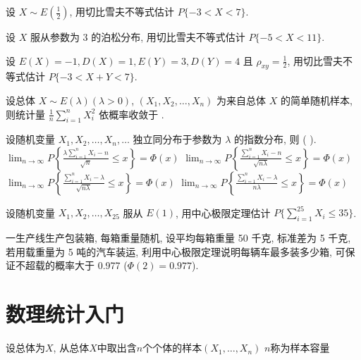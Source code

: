\documentclass[padp]{ExBook}
\begin{document}
\begin{qitems}

    \begin{bbox}
        \qitem 设 $X \sim E(\frac{1}{2})$, 用切比雪夫不等式估计 $P\{-3 < X < 7\}$.
    \end{bbox}

    \begin{bbox}
        \qitem 设 $X$ 服从参数为 3 的泊松分布, 用切比雪夫不等式估计 $P\{-5 < X < 11\}$.
    \end{bbox}

    \begin{bbox}
        \qitem 设 $E(X)=-1, D(X)=1, E(Y)=3, D(Y)=4$ 且 $\rho_{xy}=\frac{1}{2}$, 用切比雪夫不等式估计 $P\{-3 < X+Y < 7\}$.
    \end{bbox}

    \begin{bbox}
        \qitem 设总体 $X \sim E(\lambda) (\lambda>0)$, $(X_1, X_2, \dots, X_n)$ 为来自总体 $X$ 的简单随机样本, 则统计量 $\frac{1}{n}\sum_{i=1}^{n}X_i^2$ 依概率收敛于 \blankline.
    \end{bbox}

    \begin{bbox}
        \qitem 设随机变量 $X_1, X_2, \dots, X_n, \dots$ 独立同分布于参数为 $\lambda$ 的指数分布, 则 ( \quad ).
        \fourchoices
        {$\lim_{n\to\infty} P\left\{\frac{\lambda\sum_{i=1}^{n}X_i - n}{\sqrt{n}} \le x\right\} = \Phi(x)$}
        {$\lim_{n\to\infty} P\left\{\frac{\sum_{i=1}^{n}X_i - n}{\sqrt{n\lambda}} \le x\right\} = \Phi(x)$}
        {$\lim_{n\to\infty} P\left\{\frac{\sum_{i=1}^{n}X_i - \lambda}{\sqrt{n\lambda}} \le x\right\} = \Phi(x)$}
        {$\lim_{n\to\infty} P\left\{\frac{\sum_{i=1}^{n}X_i - \lambda}{n\lambda} \le x\right\} = \Phi(x)$}
    \end{bbox}

    \begin{bbox}
        \qitem 设随机变量 $X_1, X_2, \dots, X_{25}$ 服从 $E(1)$, 用中心极限定理估计 $P\{\sum_{i=1}^{25}X_i \le 35\}$.
    \end{bbox}
    
    \begin{bbox}
        \qitem 一生产线生产包装箱, 每箱重量随机, 设平均每箱重量 50 千克, 标准差为 5 千克, 若用载重量为 5 吨的汽车装运, 利用中心极限定理说明每辆车最多装多少箱, 可保证不超载的概率大于 0.977 ($\Phi(2)=0.977$).
    \end{bbox}

\end{qitems}
\section{数理统计入门}
设总体为$X$,
从总体$X$中取出含$n$个个体的样本$(X_1, \dots, X_n)$
$n$称为样本容量
\end{document}
